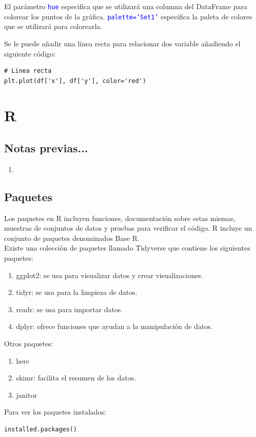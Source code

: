 \documentclass[a4paper, 12pt]{book}
\begin{document}
El parámetro \texttt{\textcolor{blue}{hue}} especifica que se utilizará una columna del DataFrame para colorear los puntos de la gráfica. \texttt{\textcolor{blue}{palette='Set1'}} especifica la paleta de colores que se utilizará para colorearla.

Se le puede añadir una línea recta para relacionar dos variable añadiendo el siguiente código:
\begin{verbatim}
# Linea recta
plt.plot(df['x'], df['y'], color='red')
\end{verbatim}
%
\chapter{R}
\section{Notas previas...}
\begin{enumerate}
\item 
\end{enumerate}
\section{Paquetes}
Los paquetes en R incluyen funciones, documentación sobre estas mismas, muestras de conjuntos de datos y pruebas para verificar el código. R incluye un conjunto de paquetes denominados Base R. \\
Existe una colección de paquetes llamado Tidyverse que contiene los siguientes paquetes:
\begin{enumerate}
\item ggplot2: se usa para visualizar datos y crear visualizaciones.
\item tidyr: se usa para la limpieza de datos.
\item readr: se usa para importar datos.
\item dplyr: ofrece funciones que ayudan a la manipulación de datos.
\end{enumerate}


Otros paquetes:
\begin{enumerate}
\item here
\item skimr: facilita el resumen de los datos.
\item janitor
\end{enumerate}

Para ver los paquetes instalados:
\begin{verbatim}
installed.packages()
\end{verbatim}
\end{document}
